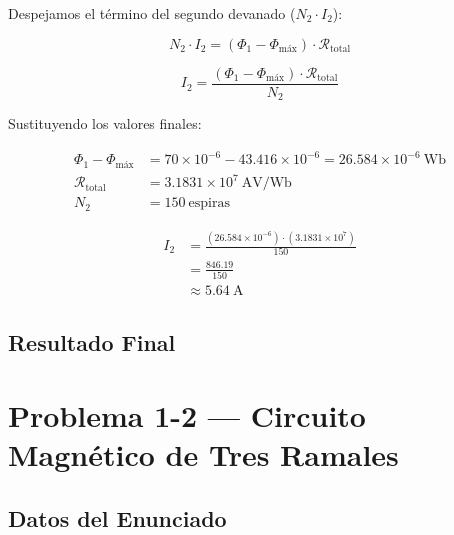 \documentclass[12pt,a4paper]{article}
\begin{document}
Despejamos el término del segundo devanado ($N_2 \cdot I_2$):

\begin{equation}
    N_2 \cdot I_2 = (\Phi_1 - \Phi_{\text{máx}}) \cdot \mathcal{R}_{\text{total}}
\end{equation}

\begin{equation}
    I_2 = \frac{(\Phi_1 - \Phi_{\text{máx}}) \cdot \mathcal{R}_{\text{total}}}{N_2}
\end{equation}

Sustituyendo los valores finales:

\begin{align*}
    \Phi_1 - \Phi_{\text{máx}} &= 70 \times 10^{-6} - 43.416 \times 10^{-6}
                                 = 26.584 \times 10^{-6}\ \si{\weber} \\
    \mathcal{R}_{\text{total}} &= 3.1831 \times 10^{7}\ \si{\ampere\volt\per\weber} \\
    N_2 &= 150\ \text{espiras}
\end{align*}

\begin{align}
    I_2 &= \frac{(26.584 \times 10^{-6}) \cdot (3.1831 \times 10^{7})}{150} \nonumber \\
        &= \frac{846.19}{150} \nonumber \\
        &\approx \SI{5.64}{\ampere}
\end{align}

\subsection{Resultado Final}

\noindent{}

\newpage

\section{Problema 1-2 --- Circuito Magnético de Tres Ramales}

\subsection{Datos del Enunciado}
\end{document}

